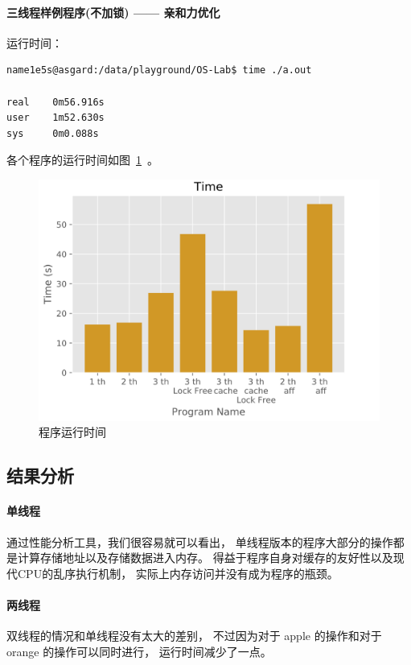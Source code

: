 \documentclass[blue,normal,cn]{elegantnote}
\begin{document}
\paragraph{三线程样例程序(不加锁) —— 亲和力优化}

运行时间：
\begin{lstlisting}
name1e5s@asgard:/data/playground/OS-Lab$ time ./a.out 

real    0m56.916s
user    1m52.630s
sys     0m0.088s
\end{lstlisting}

各个程序的运行时间如图~\ref{fig:RunningTime}~。

\begin{figure}[!htbp]
  \centering
  \includegraphics[width=.8\textwidth]{fig/lab-8}
  \caption{程序运行时间}
  \label{fig:RunningTime}
\end{figure}

\subsection{结果分析}

\paragraph{单线程} 通过性能分析工具，我们很容易就可以看出，
单线程版本的程序大部分的操作都是计算存储地址以及存储数据进入内存。
得益于程序自身对缓存的友好性以及现代CPU的乱序执行机制，
实际上内存访问并没有成为程序的瓶颈。

\paragraph{两线程} 双线程的情况和单线程没有太大的差别，
不过因为对于 apple 的操作和对于 orange 的操作可以同时进行，
运行时间减少了一点。
\end{document}
